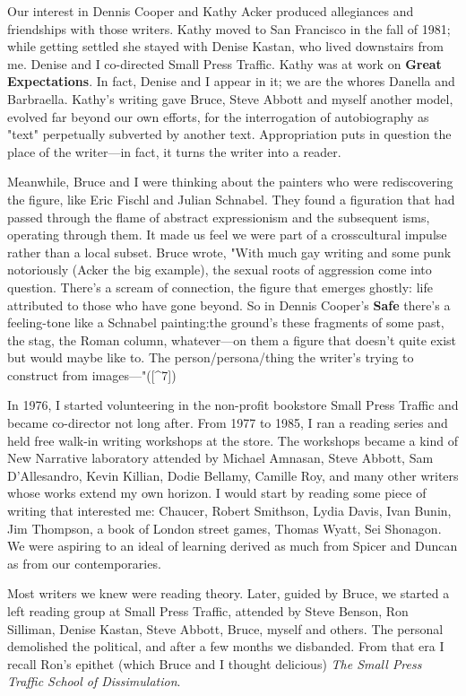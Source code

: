 Our interest in Dennis Cooper and Kathy Acker produced allegiances and
friendships with those writers. Kathy moved to San Francisco in the fall
of 1981; while getting settled she stayed with Denise Kastan, who lived
downstairs from me. Denise and I co-directed Small Press Traffic. Kathy
was at work on \textbf{Great Expectations}. In fact, Denise and I appear
in it; we are the whores Danella and Barbraella. Kathy's writing gave
Bruce, Steve Abbott and myself another model, evolved far beyond our own
efforts, for the interrogation of autobiography as "text" perpetually
subverted by another text. Appropriation puts in question the place of
the writer---in fact, it turns the writer into a reader.

Meanwhile, Bruce and I were thinking about the painters who were
rediscovering the figure, like Eric Fischl and Julian Schnabel. They
found a figuration that had passed through the flame of abstract
expressionism and the subsequent isms, operating through them. It made
us feel we were part of a crosscultural impulse rather than a local
subset. Bruce wrote, "With much gay writing and some punk notoriously
(Acker the big example), the sexual roots of aggression come into
question. There's a scream of connection, the figure that emerges
ghostly: life attributed to those who have gone beyond. So in Dennis
Cooper's \textbf{Safe} there's a feeling-tone like a Schnabel
painting:the ground's these fragments of some past, the stag, the Roman
column, whatever---on them a figure that doesn't quite exist but would
maybe like to. The person/persona/thing the writer's trying to construct
from images---"({[}\^{}7{]})

In 1976, I started volunteering in the non-profit bookstore Small Press
Traffic and became co-director not long after. From 1977 to 1985, I ran
a reading series and held free walk-in writing workshops at the store.
The workshops became a kind of New Narrative laboratory attended by
Michael Amnasan, Steve Abbott, Sam D'Allesandro, Kevin Killian, Dodie
Bellamy, Camille Roy, and many other writers whose works extend my own
horizon. I would start by reading some piece of writing that interested
me: Chaucer, Robert Smithson, Lydia Davis, Ivan Bunin, Jim Thompson, a
book of London street games, Thomas Wyatt, Sei Shonagon. We were
aspiring to an ideal of learning derived as much from Spicer and Duncan
as from our contemporaries.

Most writers we knew were reading theory. Later, guided by Bruce, we
started a left reading group at Small Press Traffic, attended by Steve
Benson, Ron Silliman, Denise Kastan, Steve Abbott, Bruce, myself and
others. The personal demolished the political, and after a few months we
disbanded. From that era I recall Ron's epithet (which Bruce and I
thought delicious) \emph{The Small Press Traffic School of
Dissimulation}.

